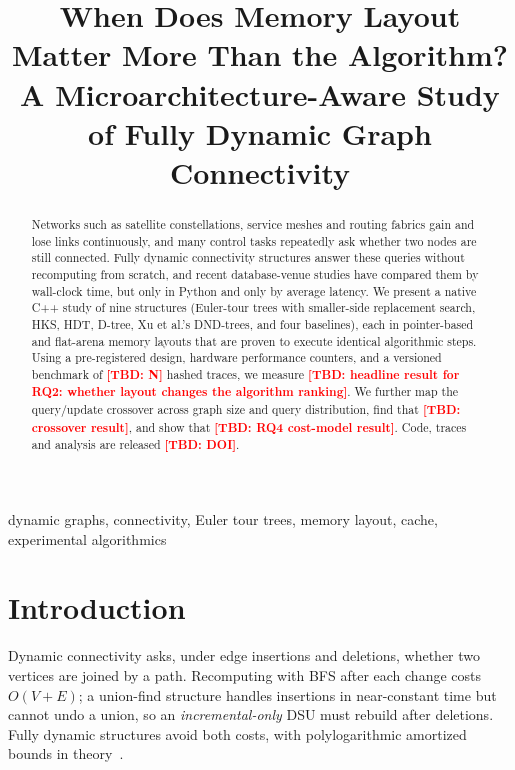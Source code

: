 \documentclass[conference]{IEEEtran}
\newcommand{\TBD}[1]{\textcolor{red}{\textbf{[TBD: #1]}}}
\begin{document}
\title{When Does Memory Layout Matter More Than the Algorithm?\\
A Microarchitecture-Aware Study of Fully Dynamic Graph Connectivity}

\author{
\IEEEauthorblockA{\TBD{affiliation}\\ \TBD{email}}}

\maketitle

\begin{abstract}
Networks such as satellite constellations, service meshes and routing fabrics gain and lose links continuously, and many control tasks repeatedly ask whether two nodes are still connected. Fully dynamic connectivity structures answer these queries without recomputing from scratch, and recent database-venue studies have compared them by wall-clock time, but only in Python and only by average latency. We present a native C++ study of nine structures (Euler-tour trees with smaller-side replacement search, HKS, HDT, D-tree, Xu et al.'s DND-trees, and four baselines), each in pointer-based and flat-arena memory layouts that are proven to execute identical algorithmic steps. Using a pre-registered design, hardware performance counters, and a versioned benchmark of \TBD{N} hashed traces, we measure \TBD{headline result for RQ2: whether layout changes the algorithm ranking}. We further map the query/update crossover across graph size and query distribution, find that \TBD{crossover result}, and show that \TBD{RQ4 cost-model result}. Code, traces and analysis are released \TBD{DOI}.
\end{abstract}

\begin{IEEEkeywords}
dynamic graphs, connectivity, Euler tour trees, memory layout, cache, experimental algorithmics
\end{IEEEkeywords}

\section{Introduction}
Dynamic connectivity asks, under edge insertions and deletions, whether two vertices are joined by a path. Recomputing with BFS after each change costs $O(V+E)$; a union-find structure handles insertions in near-constant time but cannot undo a union, so an \emph{incremental-only} DSU must rebuild after deletions. Fully dynamic structures avoid both costs, with polylogarithmic amortized bounds in theory~\cite{henzinger1999,holm2001}.
\end{document}
